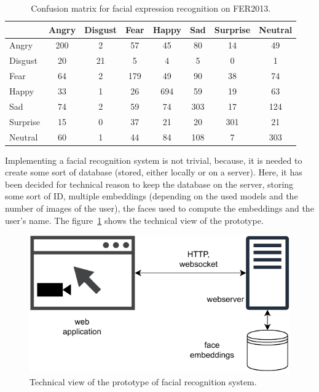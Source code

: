\documentclass[sigconf]{acmart}
\begin{document}
\begin{table}[!ht]
  \caption{Confusion matrix for facial expression recognition on FER2013\cite{serengilFacialExpressionRecognition2018}.\label{tab:confusion_matrix_emotion}}
  \begin{tabular}{@{}l|ccccccc@{}}
    \toprule
             & Angry & Disgust & Fear & Happy & Sad & Surprise & Neutral \\
    \midrule
    Angry    & 200   & 2       & 57   & 45    & 80  & 14       & 49      \\
    Disgust  & 20    & 21      & 5    & 4     & 5   & 0        & 1       \\
    Fear     & 64    & 2       & 179  & 49    & 90  & 38       & 74      \\
    Happy    & 33    & 1       & 26   & 694   & 59  & 19       & 63      \\
    Sad      & 74    & 2       & 59   & 74    & 303 & 17       & 124     \\
    Surprise & 15    & 0       & 37   & 21    & 20  & 301      & 21      \\
    Neutral  & 60    & 1       & 44   & 84    & 108 & 7        & 303     \\
    \bottomrule
  \end{tabular}
\end{table}

Implementing a facial recognition system is not trivial, because, it is needed to create some sort of database (stored, either locally or on a server). Here, it has been decided for technical reason to keep the database on the server, storing some sort of ID, multiple embeddings (depending on the used models and the number of images of the user), the faces used to compute the embeddings and the user's name. The figure~\ref{fig:facial_recognition_technical_view} shows the technical view of the prototype.

\begin{figure}[!ht]
  \centering
  \includegraphics[width=0.7\linewidth]{figures/schematics-facial_recognition_system.drawio.pdf}
  \caption{Technical view of the prototype of facial recognition system.\label{fig:facial_recognition_technical_view}}
\end{figure}
\end{document}
